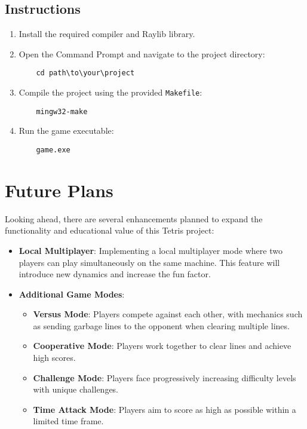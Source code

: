 \documentclass{article}
\begin{document}
\subsection{Instructions}

\begin{enumerate}
    \item Install the required compiler and Raylib library.
    \item Open the Command Prompt and navigate to the project directory:
    \begin{lstlisting}
    cd path\to\your\project
    \end{lstlisting}
    \item Compile the project using the provided \texttt{Makefile}:
    \begin{lstlisting}
    mingw32-make
    \end{lstlisting}
    \item Run the game executable:
    \begin{lstlisting}
    game.exe
    \end{lstlisting}
\end{enumerate}
\section{Future Plans}

Looking ahead, there are several enhancements planned to expand the functionality and educational value of this Tetris project:

\begin{itemize}
    \item \textbf{Local Multiplayer}: Implementing a local multiplayer mode where two players can play simultaneously on the same machine. This feature will introduce new dynamics and increase the fun factor.
    \item \textbf{Additional Game Modes}:
    \begin{itemize}
        \item \textbf{Versus Mode}: Players compete against each other, with mechanics such as sending garbage lines to the opponent when clearing multiple lines.
        \item \textbf{Cooperative Mode}: Players work together to clear lines and achieve high scores.
        \item \textbf{Challenge Mode}: Players face progressively increasing difficulty levels with unique challenges.
        \item \textbf{Time Attack Mode}: Players aim to score as high as possible within a limited time frame.
    \end{itemize}
\end{itemize}
\end{document}
